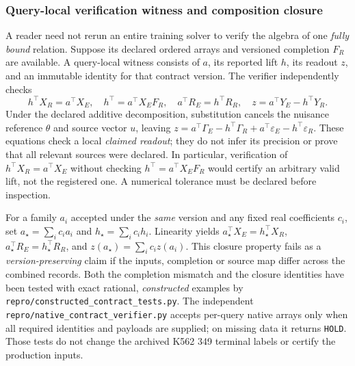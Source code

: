 \documentclass[11pt]{article}
\begin{document}
\subsubsection{Query-local verification witness and composition closure}
\label{supp:localwitness}
A reader need not rerun an entire training solver to verify the algebra of one
\emph{fully bound} relation. Suppose its declared ordered arrays and versioned
completion $F_R$ are available. A query-local witness consists of $a$, its
reported lift $h$, its readout $z$, and an immutable identity for that
contract version. The verifier independently checks
\[
 h^\top X_R=a^\top X_E,\quad h^\top=a^\top X_EF_R,\quad
 a^\top R_E=h^\top R_R,\quad z=a^\top Y_E-h^\top Y_R.
\]
Under the declared additive decomposition, substitution cancels the nuisance
reference $\theta$ and source vector $u$, leaving
$z=a^\top\Gamma_E-h^\top\Gamma_R+
 a^\top\varepsilon_E-h^\top\varepsilon_R$.
These equations check a local \emph{claimed readout}; they do not infer its
precision or prove that all relevant sources were declared. In particular,
verification of $h^\top X_R=a^\top X_E$ without checking
$h^\top=a^\top X_EF_R$ would certify an arbitrary valid lift, not the
registered one. A numerical tolerance must be declared before inspection.

For a family $a_i$ accepted under the \emph{same} version and any fixed real
coefficients $c_i$, set $a_\star=\sum_i c_i a_i$ and
$h_\star=\sum_i c_i h_i$. Linearity yields
$a_\star^\top X_E=h_\star^\top X_R$,
$a_\star^\top R_E=h_\star^\top R_R$, and
$z(a_\star)=\sum_i c_i z(a_i)$.
This closure property fails as a \emph{version-preserving} claim if the inputs,
completion or source map differ across the combined records. Both the
completion mismatch and the closure identities have been tested with exact
rational, \emph{constructed} examples by
\texttt{repro/constructed\_contract\_tests.py}. The independent
\texttt{repro/native\_contract\_verifier.py} accepts per-query native arrays
only when all required identities and payloads are supplied; on missing data
it returns \texttt{HOLD}. Those tests do not change the archived K562 349
terminal labels or certify the production inputs.



\end{document}
